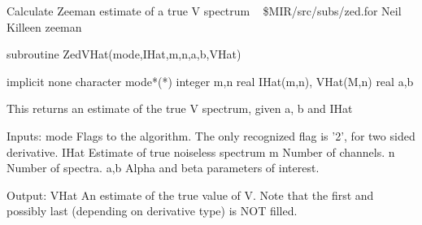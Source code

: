%
\noindent Calculate Zeeman estimate of a true V spectrum
\newline \ 
\newline {} \$MIR/src/subs/zed.for
\newline {} Neil Killeen
\newline {} zeeman
\par{\tenpoint
{\eightpoint\begintt
        subroutine ZedVHat(mode,IHat,m,n,a,b,VHat)

        implicit none
        character mode*(*)
        integer m,n
        real IHat(m,n), VHat(M,n)
        real a,b

  This returns an estimate of the true V spectrum, given a, b and IHat

  Inputs:
    mode       Flags to the algorithm. The only recognized flag is '2',
               for two sided derivative.
    IHat       Estimate of true noiseless spectrum
    m          Number of channels.
    n          Number of spectra.
    a,b        Alpha and beta parameters of interest.

  Output:
    VHat       An estimate of the true value of V.  Note that the first
               and possibly last (depending on derivative type) is NOT 
               filled.
\endtt}
\par}
